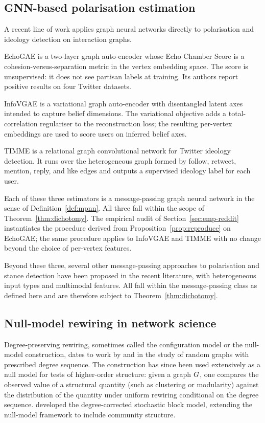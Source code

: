 \subsection{GNN-based polarisation estimation}

A recent line of work applies graph neural networks directly to
polarisation and ideology detection on interaction graphs.

EchoGAE \citep{Alatawi23EchoGAE} is a two-layer graph auto-encoder
whose Echo Chamber Score is a cohesion-versus-separation metric in
the vertex embedding space. The score is unsupervised: it does not
see partisan labels at training. Its authors report positive results
on four Twitter datasets.

InfoVGAE \citep{Li22InfoVGAE} is a variational graph auto-encoder
with disentangled latent axes intended to capture belief dimensions.
The variational objective adds a total-correlation regulariser to
the reconstruction loss; the resulting per-vertex embeddings are
used to score users on inferred belief axes.

TIMME \citep{XiaoTIMME2020} is a relational graph convolutional
network for Twitter ideology detection. It runs over the
heterogeneous graph formed by follow, retweet, mention, reply, and
like edges and outputs a supervised ideology label for each user.

Each of these three estimators is a message-passing graph neural
network in the sense of Definition~\ref{def:mpnn}. All three fall within the
scope of Theorem~\ref{thm:dichotomy}. The empirical audit of
Section~\ref{sec:emp-reddit} instantiates the procedure derived from
Proposition~\ref{prop:reproduce} on EchoGAE; the same procedure applies to
InfoVGAE and TIMME with no change beyond the choice of
per-vertex features.

Beyond these three, several other message-passing approaches to
polarisation and stance detection have been proposed in the recent
literature, with heterogeneous input types and multimodal features.
All fall within the message-passing class as defined here and are
therefore subject to Theorem~\ref{thm:dichotomy}.

\subsection{Null-model rewiring in network science}

Degree-preserving rewiring, sometimes called the configuration model
or the null-model construction, dates to work by \citet{MolloyReed1995}
and \citet{Newman2001} in the study of random graphs with prescribed
degree sequence. The construction has since been used extensively as
a null model for tests of higher-order structure: given a graph
$G$, one compares the observed value of a structural quantity
(such as clustering or modularity) against the distribution of the
quantity under uniform rewiring conditional on the degree sequence.
\citet{Karrer2011StochasticBlock} developed the degree-corrected
stochastic block model, extending the null-model framework to
include community structure.

